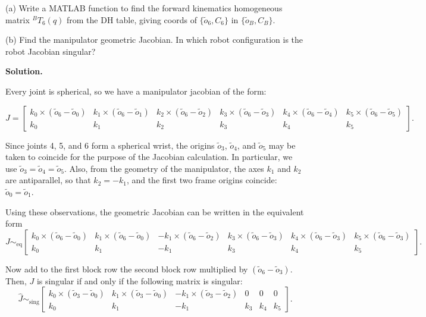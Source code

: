 \documentclass[11pt]{article}
\begin{document}
\vspace{0.5cm}

\noindent
(a) Write a MATLAB function to find the forward kinematics homogeneous matrix
$^{B}T_{6}(q)$ from the DH table, giving coords of $\{\tilde{o}_6, C_6\}$ in
$\{\tilde{o}_B, C_B\}$.

\vspace{0.3cm}

\noindent
(b) Find the manipulator geometric Jacobian. In which robot configuration is the
robot Jacobian singular?


\vspace{0.3cm}

\textbf{Solution.}

Every joint is spherical, so we have a manipulator jacobian of the form:

\[
J =
\begin{bmatrix}
k_0 \times (\tilde{o}_6 - \tilde{o}_0) &
k_1 \times (\tilde{o}_6 - \tilde{o}_1) &
k_2 \times (\tilde{o}_6 - \tilde{o}_2) &
k_3 \times (\tilde{o}_6 - \tilde{o}_3) &
k_4 \times (\tilde{o}_6 - \tilde{o}_4) &
k_5 \times (\tilde{o}_6 - \tilde{o}_5) \\
k_0 & k_1 & k_2 & k_3 & k_4 & k_5
\end{bmatrix}.
\]

Since joints 4, 5, and 6 form a spherical wrist, the origins $\tilde{o}_3$, $\tilde{o}_4$, and $\tilde{o}_5$ may be taken to coincide for the purpose of the Jacobian calculation. In particular, we use $\tilde{o}_3 = \tilde{o}_4 = \tilde{o}_5$.
Also, from the geometry of the manipulator, the axes $k_1$ and $k_2$ are antiparallel, so that $k_2 = -k_1$, 
and the first two frame origins coincide: $\tilde{o}_0 = \tilde{o}_1.$

Using these observations, the geometric Jacobian can be written in the equivalent form
\[
J \sim_{\mathrm{eq}}
\begin{bmatrix}
k_0 \times (\tilde{o}_6 - \tilde{o}_0) &
k_1 \times (\tilde{o}_6 - \tilde{o}_0) &
-k_1 \times (\tilde{o}_6 - \tilde{o}_2) &
k_3 \times (\tilde{o}_6 - \tilde{o}_3) &
k_4 \times (\tilde{o}_6 - \tilde{o}_3) &
k_5 \times (\tilde{o}_6 - \tilde{o}_3) \\
k_0 & k_1 & -k_1 & k_3 & k_4 & k_5
\end{bmatrix}.
\]

Now add to the first block row the second block row multiplied by $(\tilde{o}_6-\tilde{o}_3)$.
Then, $J$ is singular if and only if the following matrix is singular:
\[
\widehat{J} \sim_{\mathrm{sing}}
\begin{bmatrix}
k_0 \times (\tilde{o}_3 - \tilde{o}_0) &
k_1 \times (\tilde{o}_3 - \tilde{o}_0) &
-k_1 \times (\tilde{o}_3 - \tilde{o}_2) &
0 &
0 &
0 \\
k_0 & k_1 & -k_1 & k_3 & k_4 & k_5
\end{bmatrix}.
\]
\end{document}
